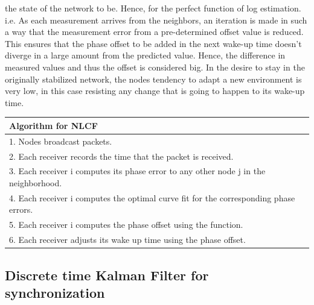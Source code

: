 \documentclass[a4paper,10pt]{report}
\begin{document}
the state of the network to be. Hence, for the perfect function of log estimation.
i.e. \newline \newline
As each measurement arrives from the neighbors, an iteration is made in such a way that
the measurement error from a pre-determined offset value is reduced.
This ensures that the phase offset to be added in the next wake-up
time doesn't diverge in a large amount from the predicted value.
Hence, the difference in measured values and thus the offset is
considered big. In the desire to stay in the originally stabilized
network, the nodes tendency to adapt a new environment is very low,
in this case resisting any change that is going to happen to its
wake-up time. \newline
\newline
\begin{tabular}{  l }Algorithm for NLCF \\\hline
1. Nodes broadcast packets. \\  2. Each receiver records the time that the packet is received. \\
3. Each receiver i computes its phase error to any other node j in the neighborhood. \\
4. Each receiver i computes the optimal curve fit for the corresponding phase errors. \\
5. Each receiver i computes the phase offset using the function. \\
6. Each receiver adjusts its wake up time using the phase offset.\\
\hline
\end{tabular}
\subsection{\textbf{Discrete time Kalman Filter for synchronization}}
\end{document}
